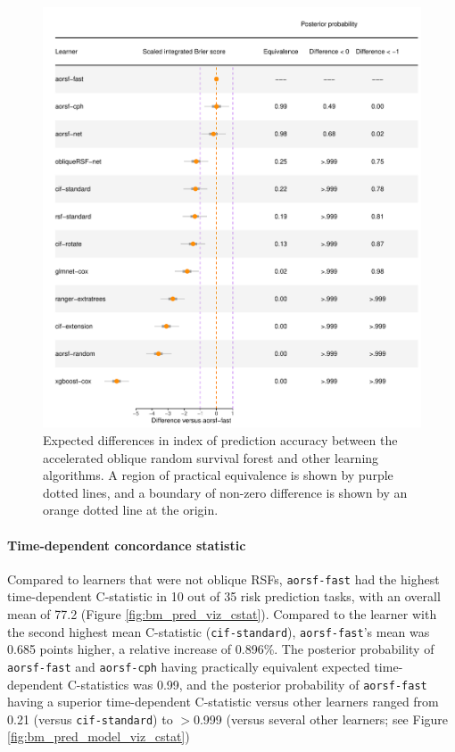 \documentclass{article}\usepackage[]{graphicx}\usepackage[]{xcolor}
\makeatletter
\def\maxwidth{ %
  \ifdim\Gin@nat@width>\linewidth
    \linewidth
  \else
    \Gin@nat@width
  \fi
}
\newenvironment{knitrout}{}{} %
\makeatother
\begin{document}
\begin{knitrout}
\color{fgcolor}\begin{figure}
\includegraphics[width=\maxwidth]{figure/bm_pred_model_viz_ibs-1} \caption[Expected differences in index of prediction accuracy between the accelerated oblique random survival forest and other learning algorithms]{Expected differences in index of prediction accuracy between the accelerated oblique random survival forest and other learning algorithms. A region of practical equivalence is shown by purple dotted lines, and a boundary of non-zero difference is shown by an orange dotted line at the origin.}\label{fig:bm_pred_model_viz_ibs}
\end{figure}

\end{knitrout}

\paragraph{Time-dependent concordance statistic}




Compared to learners that were not oblique RSFs, \texttt{aorsf-fast} had the highest time-dependent C-statistic in 10 out of 35 risk prediction tasks, with an overall mean of 77.2 (Figure \ref{fig:bm_pred_viz_cstat}). Compared to the learner with the second highest mean C-statistic (\texttt{cif-standard}), \texttt{aorsf-fast}'s mean was 0.685 points higher, a relative increase of 0.896\%. The posterior probability of \texttt{aorsf-fast} and \texttt{aorsf-cph} having practically equivalent expected time-dependent C-statistics was 0.99, and the posterior probability of \texttt{aorsf-fast} having a superior time-dependent C-statistic versus other learners ranged from 0.21 (versus \texttt{cif-standard}) to $>$0.999 (versus several other learners; see Figure \ref{fig:bm_pred_model_viz_cstat})
\end{document}

